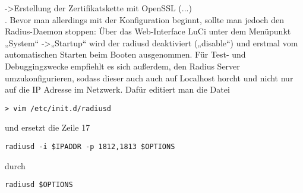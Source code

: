 ->Erstellung der Zertifikatskette mit OpenSSL (...)\\
. Bevor man allerdings mit der Konfiguration beginnt, sollte man jedoch den Radius-Daemon
stoppen: Über das Web-Interface LuCi unter dem Menüpunkt „System“ ->„Startup“ wird der
radiusd deaktiviert („disable“) und erstmal vom automatischen Starten beim Booten
ausgenommen. Für Test- und Debuggingzwecke empfiehlt es sich außerdem, den Radius Server
umzukonfigurieren, sodass dieser auch auch auf Localhost horcht und nicht nur auf die IP Adresse
im Netzwerk. Dafür editiert man die Datei
\begin{lstlisting}
> vim /etc/init.d/radiusd
\end{lstlisting}
und ersetzt die Zeile 17
\begin{lstlisting}
radiusd -i $IPADDR -p 1812,1813 $OPTIONS
\end{lstlisting}
durch
\begin{lstlisting}
radiusd $OPTIONS
\end{lstlisting}






















